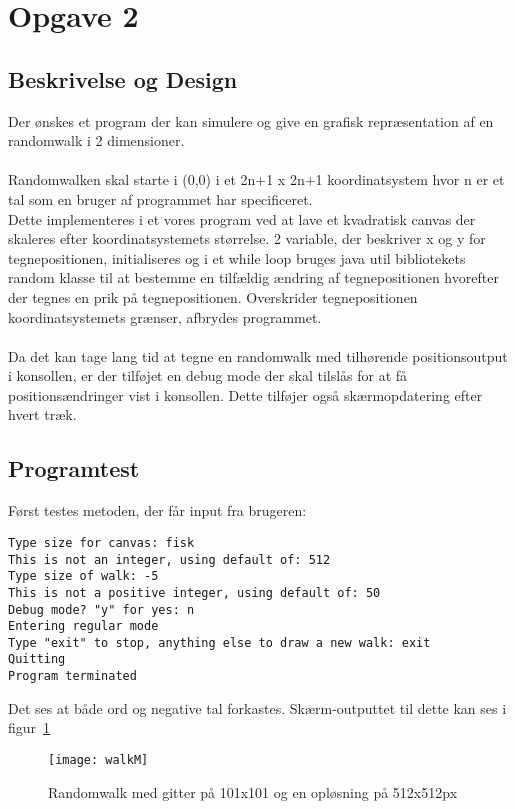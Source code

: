 \section{Opgave 2}
\subsection{Beskrivelse og Design}
Der ønskes et program der kan simulere og give en grafisk repræsentation af en randomwalk i 2 dimensioner. \\
\\
Randomwalken skal starte i (0,0) i et 2n+1 x 2n+1 koordinatsystem hvor n er et tal som en bruger af programmet har specificeret. \\
Dette implementeres i et vores program ved at lave et kvadratisk canvas der skaleres efter koordinatsystemets størrelse.
2 variable, der beskriver x og y for tegnepositionen, initialiseres og i et while loop bruges java util bibliotekets random klasse til at bestemme en tilfældig ændring af tegnepositionen hvorefter der tegnes en prik på tegnepositionen. Overskrider tegnepositionen koordinatsystemets grænser, afbrydes programmet.
\\
\\
Da det kan tage lang tid at tegne en randomwalk med tilhørende positionsoutput i konsollen, er der tilføjet en debug mode der skal tilslås for at få positionsændringer vist i konsollen. Dette tilføjer også skærmopdatering efter hvert træk.

\subsection{Programtest}
Først testes metoden, der får input fra brugeren:

\begin{lstlisting}
Type size for canvas: fisk
This is not an integer, using default of: 512
Type size of walk: -5
This is not a positive integer, using default of: 50
Debug mode? "y" for yes: n
Entering regular mode
Type "exit" to stop, anything else to draw a new walk: exit
Quitting
Program terminated
\end{lstlisting}
Det ses at både ord og negative tal forkastes. Skærm-outputtet til dette kan ses i figur~\ref{fig:walkM}

\begin{figure}[h!]
	\centering
	\texttt{[image: walkM]}
		\caption{Randomwalk med gitter på 101x101 og en opløsning på 512x512px}\label{fig:walkM}
\end{figure}

